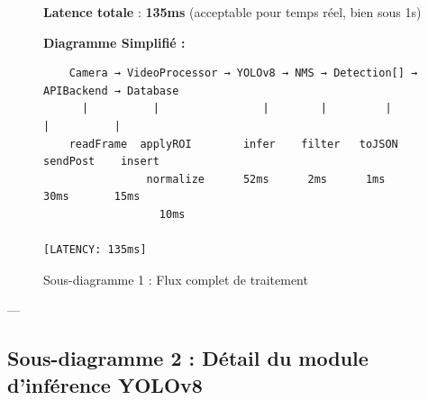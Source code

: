 \begin{figure}[H]
{\begin{minipage}{0.95\textwidth}
    \vspace{0.3cm}
    
    \textbf{Latence totale} : \textbf{135ms} (acceptable pour temps réel, bien sous 1s)
    
    \vspace{0.3cm}
    
    \begin{center}
    \textbf{Diagramme Simplifié :}
    \end{center}
    
    \vspace{0.2cm}
    
    \begin{verbatim}
    Camera → VideoProcessor → YOLOv8 → NMS → Detection[] → APIBackend → Database
      |          |                |        |         |           |          |
    readFrame  applyROI        infer    filter   toJSON      sendPost    insert
                normalize      52ms      2ms      1ms         30ms       15ms
                  10ms                                                        
                                                      [LATENCY: 135ms]
    \end{verbatim}
    
    \end{minipage}}
    \caption{Sous-diagramme 1 : Flux complet de traitement}
    \label{fig:seq-complete}
\end{figure}

---

\subsection{Sous-diagramme 2 : Détail du module d'inférence YOLOv8}

